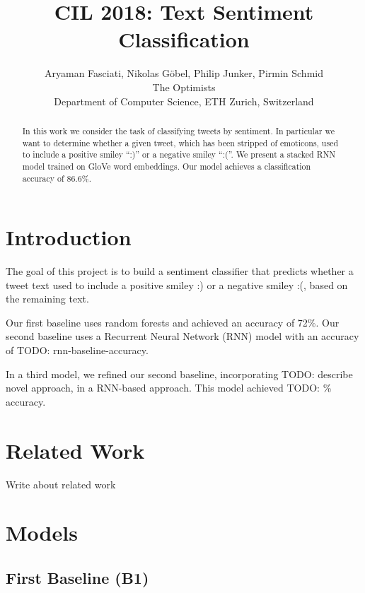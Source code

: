 \documentclass[10pt,conference,compsocconf]{IEEEtran}
\newcommand{\todo}[1]{}
\renewcommand{\todo}[1]{{\color{red} TODO: {#1}}}
\begin{document}
\title{CIL 2018: Text Sentiment Classification}

\author{
  Aryaman Fasciati, Nikolas G\"obel, Philip Junker, Pirmin Schmid\\
  The Optimists\\
  Department of Computer Science, ETH Zurich, Switzerland
}

\maketitle

\begin{abstract}
  In this work we consider the task of classifying tweets by
  sentiment. In particular we want to determine whether a given tweet,
  which has been stripped of emoticons, used to include a positive
  smiley ``:)'' or a negative smiley ``:(''. We present a stacked RNN
  model trained on GloVe word embeddings. Our model achieves a
  classification accuracy of 86.6\%.
\end{abstract}


\section{Introduction}

The goal of this project is to build a sentiment classifier that
predicts whether a tweet text used to include a positive smiley :) or
a negative smiley :(, based on the remaining text.

Our first baseline uses random forests and achieved an accuracy of
72\%. Our second baseline uses a Recurrent Neural Network (RNN) model
with an accuracy of \todo{rnn-baseline-accuracy}.

In a third model, we refined our second baseline, incorporating
\todo{describe novel approach}, in a RNN-based approach. This model
achieved \todo{\%} accuracy.


\section{Related Work}
Write about related work \cite{go2016mastering}


\section{Models}

\subsection{First Baseline (B1)}
\end{document}
